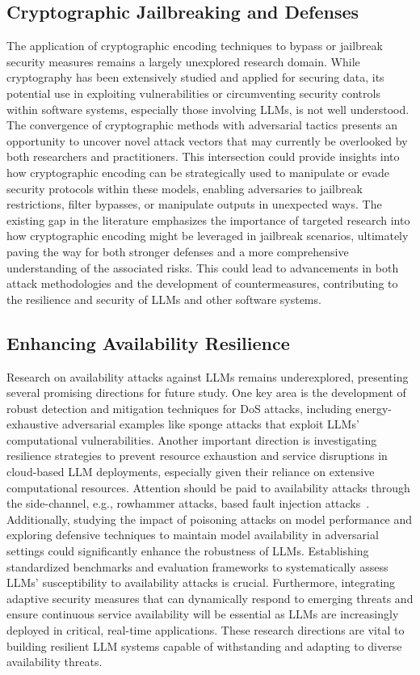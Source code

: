 \subsection{Cryptographic Jailbreaking and Defenses}

The application of cryptographic encoding techniques to bypass or jailbreak security measures remains a largely unexplored research domain. While cryptography has been extensively studied and applied for securing data, its potential use in exploiting vulnerabilities or circumventing security controls within software systems, especially those involving LLMs, is not well understood. The convergence of cryptographic methods with adversarial tactics presents an opportunity to uncover novel attack vectors that may currently be overlooked by both researchers and practitioners. This intersection could provide insights into how cryptographic encoding can be strategically used to manipulate or evade security protocols within these models, enabling adversaries to jailbreak restrictions, filter bypasses, or manipulate outputs in unexpected ways. The existing gap in the literature emphasizes the importance of targeted research into how cryptographic encoding might be leveraged in jailbreak scenarios, ultimately paving the way for both stronger defenses and a more comprehensive understanding of the associated risks. This could lead to advancements in both attack methodologies and the development of countermeasures, contributing to the resilience and security of LLMs and other software systems.

\subsection{Enhancing Availability Resilience} 

Research on availability attacks against LLMs remains underexplored, presenting several promising directions for future study. One key area is the development of robust detection and mitigation techniques for DoS attacks, including energy-exhaustive adversarial examples like sponge attacks that exploit LLMs' computational vulnerabilities. Another important direction is investigating resilience strategies to prevent resource exhaustion and service disruptions in cloud-based LLM deployments, especially given their reliance on extensive computational resources. Attention should be paid to availability attacks through the side-channel, e.g., rowhammer attacks, based fault injection attacks~\cite{li2024yes}. Additionally, studying the impact of poisoning attacks on model performance and exploring defensive techniques to maintain model availability in adversarial settings could significantly enhance the robustness of LLMs. Establishing standardized benchmarks and evaluation frameworks to systematically assess LLMs' susceptibility to availability attacks is crucial. Furthermore, integrating adaptive security measures that can dynamically respond to emerging threats and ensure continuous service availability will be essential as LLMs are increasingly deployed in critical, real-time applications. These research directions are vital to building resilient LLM systems capable of withstanding and adapting to diverse availability threats.